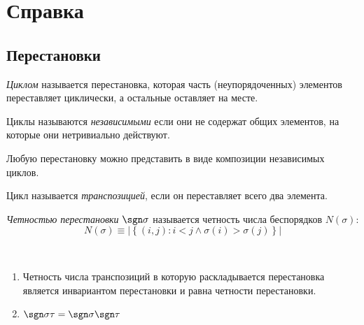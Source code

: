 \newpage
\section{Справка}
\subsection{Перестановки}
\begin{definition}
  \emph{Циклом} называется перестановка, которая часть (неупорядоченных) элементов переставляет циклически, а остальные оставляет на месте.
\end{definition}

\begin{definition}
  Циклы называются \emph{независимыми} если они не содержат общих элементов, на которые они нетривиально действуют.
\end{definition}

\begin{theorem}
  Любую перестановку можно представить в виде композиции независимых циклов.
\end{theorem}

\begin{definition}
  Цикл называется \emph{транспозицией}, если он переставляет всего два элемента.
\end{definition}

\begin{definition}
  \emph{Четностью перестановки} $\sgn\sigma$ называется четность числа беспорядков $N(\sigma)$:\\
  \[N(\sigma)\equiv \left|\left\{\left(i,j\right)\colon i<j \land \sigma(i)>\sigma(j)\right\}\right|\]
\end{definition}

\begin{theorem}\
  \begin{enumerate}
    \item Четность числа транспозиций в которую раскладывается перестановка является инвариантом перестановки и равна четности перестановки.
    \item $\sgn\sigma\tau=\sgn\sigma\sgn\tau$
  \end{enumerate}
\end{theorem}
